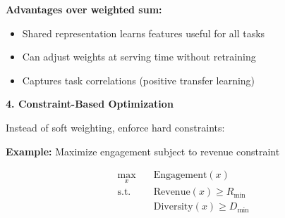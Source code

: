 \documentclass[10pt]{article}
\begin{document}
\textbf{Advantages over weighted sum:}
\begin{itemize}
\item Shared representation learns features useful for all tasks
\item Can adjust weights at serving time without retraining
\item Captures task correlations (positive transfer learning)
\end{itemize}

\textbf{4. Constraint-Based Optimization}

Instead of soft weighting, enforce hard constraints:

\textbf{Example:} Maximize engagement subject to revenue constraint

\begin{equation}
\begin{aligned}
\max_{x} \quad & \text{Engagement}(x) \\
\text{s.t.} \quad & \text{Revenue}(x) \geq R_{\min} \\
& \text{Diversity}(x) \geq D_{\min}
\end{aligned}
\end{equation}
\end{document}
